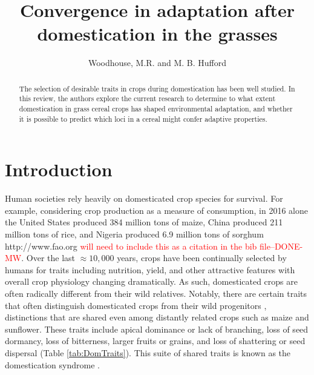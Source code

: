 \documentclass[12pt]{article}
\title{Convergence in adaptation after domestication in the grasses}
\author{Woodhouse, M.R. and M. B. Hufford}
\newcommand{\mbh}[1]{\textcolor{red}{\normalsize  #1}}
\begin{document}
\maketitle

\begin{abstract}
The selection of desirable traits in crops during domestication has been well studied. In this review, the authors explore the current research to determine to what extent domestication in grass cereal crops has shaped environmental adaptation, and whether it is possible to predict which loci in a cereal might confer adaptive properties.
\end{abstract}

\section*{Introduction}
Human societies rely heavily on domesticated crop species for survival.
For example, considering crop production as a measure of consumption, in 2016 alone the United States produced 384 million tons of maize, China produced 211 million tons of rice, and Nigeria produced 6.9 million tons of sorghum http://www.fao.org \citep{FAOSTAT2018} \mbh{will need to include this as a citation in the bib file--DONE-MW}.
Over the last $\approx10,000$ years, crops have been continually selected by humans for traits including nutrition, yield, and other attractive features with overall crop physiology changing dramatically.
As such, domesticated crops are often radically different from their wild relatives.
Notably, there are certain traits that often distinguish domesticated crops from their wild progenitors \citep{Doebley2006}, distinctions that are shared even among distantly related crops such as maize and sunflower.
These traits include apical dominance or lack of branching, loss of seed dormancy, loss of bitterness, larger fruits or grains, and loss of shattering or seed dispersal (Table \ref{tab:DomTraits}).
This suite of shared traits is known as the domestication syndrome \citep{Hammer1984}.
\end{document}
